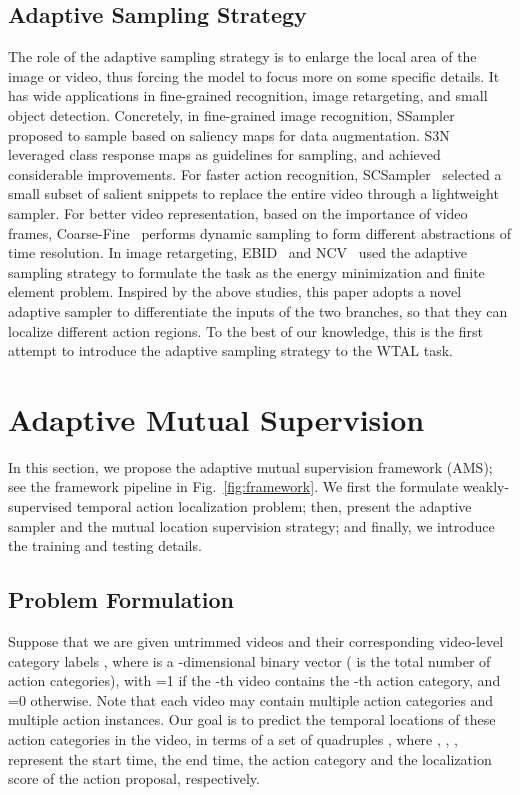 \documentclass[journal]{IEEEtran}
\begin{document}
\subsection{Adaptive Sampling Strategy}
The role of the adaptive sampling strategy is to enlarge the local area of the image or video, thus forcing the model to focus more on some specific details. It has wide applications in fine-grained recognition, image retargeting, and small object detection. Concretely, in fine-grained image recognition, SSampler~\cite{recasens2018learning} proposed to sample based on saliency maps for data augmentation. S3N~\cite{ding2019selective} leveraged class response maps as guidelines for sampling, and achieved considerable improvements. For faster action recognition, SCSampler~\cite{korbar2019scsampler} selected a small subset of salient snippets to replace the entire video through a lightweight sampler. For better video representation, based on the importance of video frames, Coarse-Fine~\cite{kahatapitiya2021coarse} performs dynamic sampling to form different abstractions of time resolution. In image retargeting, EBID~\cite{karni2009energy} and NCV~\cite{wolf2007non} used the adaptive sampling strategy to formulate the task as the energy minimization and finite element problem. Inspired by the above studies, this paper adopts a novel adaptive sampler to differentiate the inputs of the two branches, so that they can localize different action regions. To the best of our knowledge, this is the first attempt to introduce the adaptive sampling strategy to the WTAL task.




\section{Adaptive Mutual Supervision} \label{section:method}
In this section, we propose the adaptive mutual supervision framework (AMS); see the framework pipeline in Fig.~\ref{fig:framework}. We first the formulate weakly-supervised temporal action localization problem; then, present the adaptive sampler and the mutual location supervision strategy; and finally, we introduce the training and testing details.



\subsection{Problem Formulation}
Suppose that we are given  untrimmed videos  and their corresponding video-level category labels , where  is a -dimensional binary vector ( is the total number of action categories), with =1 if the -th video contains the -th action category, and =0 otherwise. Note that each video may contain multiple action categories and multiple action instances. Our goal is to predict the temporal locations of these action categories in the video, in terms of a set of quadruples , where , , ,  represent the start time, the end time, the action category and the localization score of the action proposal, respectively. 
\end{document}
